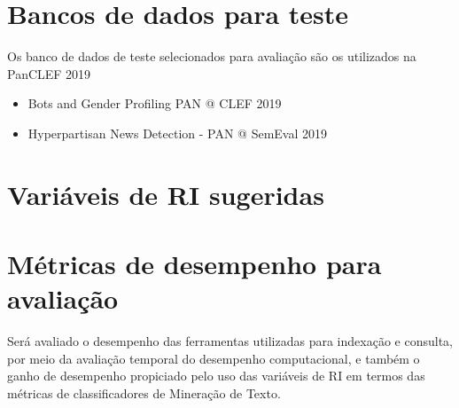     
\section{Bancos de dados para teste}  \label{sec:Bancos-de-dados-para-teste}
    Os banco de dados de teste selecionados para avaliação são os utilizados na PanCLEF 2019 %

    \begin{itemize}
        \item Bots and Gender Profiling PAN @ CLEF 2019
        \item Hyperpartisan News Detection - PAN @ SemEval 2019
    \end{itemize}
    
 



\section{Variáveis de RI sugeridas}  \label{sec:Variáveis-de-RI-sugeridas}
    


\section{Métricas de desempenho para avaliação}  \label{sec:Métricas-de-desempenho-para-avaliação}
    Será avaliado o desempenho das ferramentas utilizadas para indexação e consulta, por meio da avaliação temporal do desempenho computacional, e também o ganho de desempenho propiciado pelo uso das variáveis de RI em termos das métricas de classificadores de Mineração de Texto. %
    
